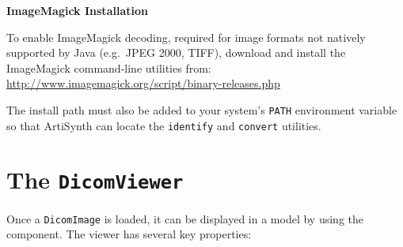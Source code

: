 \begin{sideblock}
\textbf{ImageMagick Installation}

To enable ImageMagick decoding, required for image formats not natively supported
by Java (e.g.~JPEG 2000, TIFF), download and install the ImageMagick command-line utilities 
from: \url{http://www.imagemagick.org/script/binary-releases.php}

The install path must also be added to your system's \texttt{PATH} environment variable
so that ArtiSynth can locate the \texttt{identify} and \texttt{convert} utilities.
\end{sideblock}

\section{The \texttt{DicomViewer}}

Once a \lstinline{DicomImage} is loaded, it can be displayed in a model by using the
 component.  The viewer
has several key properties:

